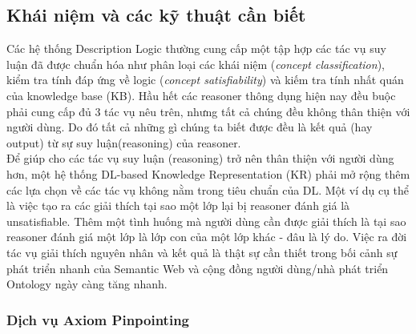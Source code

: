 		\subsection{Khái niệm và các kỹ thuật cần biết}
		Các hệ thống Description Logic thường cung cấp một tập hợp các tác vụ suy luận đã được chuẩn hóa như phân loại các khái niệm (\textit{concept classification}), kiểm tra tính đáp ứng về logic (\textit{concept satisfiability}) và kiếm tra tính nhất quán của knowledge base (KB). Hầu hết các reasoner thông dụng hiện nay đều buộc phải cung cấp đủ 3 tác vụ nêu trên, nhưng tất cả chúng đều không thân thiện với người dùng. Do đó tất cả những gì chúng ta biết được đều là kết quả (hay output) từ sự suy luận(reasoning) của reasoner. 
		\\
		\hspace*{0.05\textwidth}  Để giúp cho các tác vụ suy luận (reasoning) trở nên thân thiện với người dùng hơn, một hệ thống DL-based Knowledge Representation (KR) phải mở rộng thêm các lựa chọn về các tác vụ không nằm trong tiêu chuẩn của DL. Một ví dụ cụ thể là việc tạo ra các giải thích tại sao một lớp lại bị reasoner đánh giá là unsatisfiable. Thêm một tình huống mà người dùng cần được giải thích là tại sao reasoner đánh giá một lớp là lớp con của một lớp khác - đâu là lý do. Việc ra đời tác vụ giải thích nguyên nhân và kết quả là thật sự cần thiết trong bối cảnh sự phát triển nhanh của Semantic Web và cộng đồng người dùng/nhà phát triển Ontology ngày càng tăng nhanh.
		\subsubsection{Dịch vụ Axiom Pinpointing}
